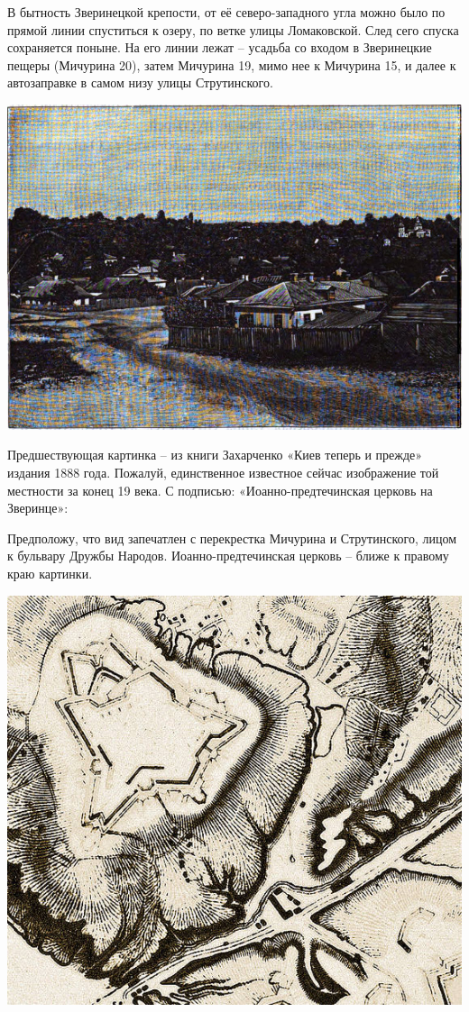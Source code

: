 В бытность Зверинецкой крепости, от её северо-запад\-ного угла можно было по прямой линии спуститься к озеру, по ветке улицы Ломаковской. След сего спуска сохраняется поныне. На его линии лежат – усадьба со входом в Зверинецкие пещеры (Мичурина 20), затем Мичурина 19, мимо нее к Мичурина 15, и далее к автозаправке в самом низу улицы Струтинского.

\begin{center}
\includegraphics[width=\linewidth]{chast-vosp/zver/1888-zver.jpg}
\end{center}

Предшествующая картинка – из книги Захарченко «Киев теперь и прежде» издания 1888 года. Пожалуй, единственное известное сейчас изображение той местности за конец 19 века. С подписью: «Иоанно-предтечин\-ская церковь на Зверинце»:

Предположу, что вид запечатлен с перекрестка Мичурина и Струтинского, лицом к бульвару Дружбы Народов. Иоанно-предтечинская церковь – ближе к правому краю картинки.

\begin{center}
\includegraphics[width=0.95\linewidth]{chast-vosp/zver/1843-map.jpg}
\end{center}

